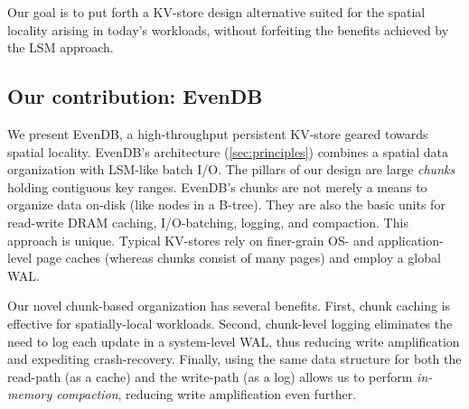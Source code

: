\documentclass[sigplan,10pt]{acmart}
\newcommand{\remove}[1]{}
\newcommand{\sys}{EvenDB}
\begin{document}
Our  goal is to 
put forth a KV-store design alternative  suited for the 
spatial locality arising in today's  workloads, without forfeiting the benefits achieved by the LSM approach.




\subsection{Our contribution: \sys}

We present \sys, a high-throughput persistent KV-store geared towards spatial locality. 
\sys's  architecture (\cref{sec:principles}) combines a spatial data organization with LSM-like  batch I/O. 
The pillars of our design are large \emph{chunks} holding contiguous key ranges. 
\sys's chunks are not merely  a means to organize data on-disk (like nodes in a B-tree). They 
are also the basic units for read-write DRAM caching, I/O-batching, logging, and compaction. 
This approach is unique.
Typical KV-stores rely on finer-grain OS- and application-level page caches (whereas chunks consist of many pages) and employ a global WAL. 

\remove{
B-trees, e.g., InnoDB, use read-write page caches~\cite{InnoDB-Buffer-Pool}, however they fail to capture spatial locality 
because their cache granularity is too fine, which results in poor-performing near-random writes~\cite{toku-rocks-inno}.  
LSM's, e.g., RocksDB, use caches for the read path only~\cite{RocksDB-blockcache}. Their temporal structure optimizes write
performance in the short term but degrades it in the long term, due to compactions. Here too, 
spatial locality remains unexploited.}

Our novel chunk-based organization has several benefits. 
First, chunk caching is effective for spatially-local workloads.
Second, chunk-level logging eliminates the need to log each update in a system-level WAL, thus 
reducing write amplification and expediting crash-recovery. 
Finally, using the same data structure for both the read-path (as a cache) and the write-path
(as a log) allows us to perform \emph{in-memory compaction}, reducing write amplification even further.
\end{document}
